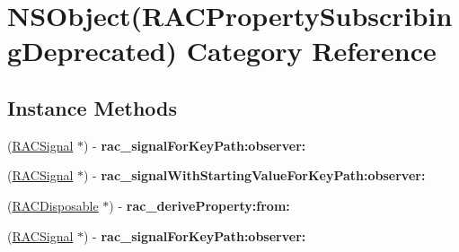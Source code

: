 \hypertarget{category_n_s_object_07_r_a_c_property_subscribing_deprecated_08}{}\section{N\+S\+Object(R\+A\+C\+Property\+Subscribing\+Deprecated) Category Reference}
\label{category_n_s_object_07_r_a_c_property_subscribing_deprecated_08}
\subsection*{Instance Methods}
\begin{DoxyCompactItemize}
\item 
\mbox{\label{category_n_s_object_07_r_a_c_property_subscribing_deprecated_08_ab8afdc7b598a75e3d34cfe75c963991c}} 
(\mbox{\hyperlink{interface_r_a_c_signal}{R\+A\+C\+Signal}} $\ast$) -\/ {\bfseries rac\+\_\+signal\+For\+Key\+Path\+:observer\+:}
\item 
\mbox{\label{category_n_s_object_07_r_a_c_property_subscribing_deprecated_08_ad28ba3e44343ff4df9cd418016c1722d}} 
(\mbox{\hyperlink{interface_r_a_c_signal}{R\+A\+C\+Signal}} $\ast$) -\/ {\bfseries rac\+\_\+signal\+With\+Starting\+Value\+For\+Key\+Path\+:observer\+:}
\item 
\mbox{\label{category_n_s_object_07_r_a_c_property_subscribing_deprecated_08_a141937c1184b0cc9235ea98780ab70b7}} 
(\mbox{\hyperlink{interface_r_a_c_disposable}{R\+A\+C\+Disposable}} $\ast$) -\/ {\bfseries rac\+\_\+derive\+Property\+:from\+:}
\item 
\mbox{\label{category_n_s_object_07_r_a_c_property_subscribing_deprecated_08_ab8afdc7b598a75e3d34cfe75c963991c}} 
(\mbox{\hyperlink{interface_r_a_c_signal}{R\+A\+C\+Signal}} $\ast$) -\/ {\bfseries rac\+\_\+signal\+For\+Key\+Path\+:observer\+:}
\item 
\mbox{\label{category_n_s_object_07_r_a_c_property_subscribing_deprecated_08_ad28ba3e44343ff4df9cd418016c1722d}} 

\end{DoxyCompactItemize}

